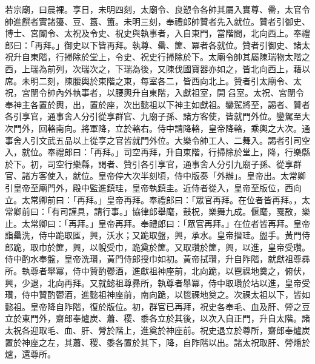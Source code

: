 \begin{pinyinscope}
 若宗廟，曰晨裸。享日，未明四刻，太廟令、良愬令各帥其屬入實尊、罍，太官令帥進饌者實諸籩、豆、簋、簠。未明三刻，奉禮郎帥贊者先入就位。贊者引御史、博士、宮闈令、太祝及令史、祝史與執事者，入自東門，當階間，北向西上。奉禮郎曰：「再拜。」御史以下皆再拜。執尊、罍、篚、冪者各就位。贊者引御史、諸太祝升自東階，行掃除於堂上，令史、祝史行掃除於下。太廟令帥其屬陳瑞物太階之西，上瑞為前列，次瑞次之，下瑞為後，又陳伐國寶器亦如之，皆北向西上，藉以席。未明二刻，陳腰輿於東階之東，每室各二，皆西向北上。贊者引太廟令、太祝，宮闈令帥內外執事者，以腰輿升自東階，入獻祖室，開臽室。太祝、宮闈令奉神主各置於輿，出，置於座，次出懿祖以下神主如獻祖。鑾駕將至，謁者、贊者各引享官，通事舍人分引從享群官、九廟子孫、諸方客使，皆就門外位。鑾駕至大次門外，回輅南向。將軍降，立於輅右。侍中請降輅，皇帝降輅，乘輿之大次。通事舍人引文武五品以上從享之官皆就門外位。大樂令帥工人、二舞入。謁者引司空入，就位。奉禮郎曰：「再拜。」司空再拜，升自東階，行掃除於堂上，降，行樂縣於下。初，司空行樂縣，謁者、贊引各引享官，通事舍人分引九廟子孫、從享群官、諸方客使入，就位。皇帝停大次半刻頃，侍中版奏「外辦」。皇帝出。太常卿引皇帝至廟門外，殿中監進鎮珪，皇帝執鎮圭。近侍者從入，皇帝至版位，西向立。太常卿前曰：「再拜。」皇帝再拜。奉禮郎曰：「眾官再拜。在位者皆再拜。，太常卿前曰：「有司謹具，請行事。」協律郎舉麾，鼓柷，樂舞九成。偃麾，戛敔，樂止。太常卿曰：「再拜。」皇帝再拜。奉禮郎曰：「眾官再拜。」在位者皆再拜。皇帝詣罍洗，侍中跪取匜，興，沃水；又跪取盤，興，承水。皇帝搢珪。盥手。黃門侍郎跪，取巾於篚，興，以帨受巾，跪奠於篚。又取瓚於篚，興，以進，皇帝受瓚。侍中酌水奉盤，皇帝洗瓚，黃門侍郎授巾如初。黃帝拭瓚，升自阼階，就獻祖尊彞所。執尊者舉冪，侍中贊酌鬱酒，進獻祖神座前，北向跪，以鬯祼地奠之，俯伏，興，少退，北向再拜。又就懿祖尊彞所，執尊者舉冪，侍中取瓚於坫以進，皇帝受瓚，侍中贊酌鬱酒，進懿祖神座前，南向跪，以鬯祼地奠之。次祼太祖以下，皆如懿祖。皇帝降自阼階，復於版位。初，群官已再拜，祝史各奉毛、血及肝、膋之豆立於東門外，齋郎奉爐炭、蕭、稷、黍各立於其後，以次入自正門，升自太階。諸太祝各迎取毛、血、肝、膋於階上，進奠於神座前。祝史退立於尊所，齋郎奉爐炭置於神座之左，其蕭、稷、黍各置於其下，降，自阼階以出。諸太祝取肝、膋燔於爐，還尊所。



\end{pinyinscope}